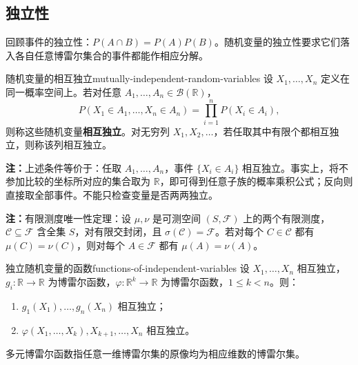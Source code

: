 \subsection*{独立性}

回顾事件的独立性：$P(A\cap B)=P(A)P(B)$。随机变量的独立性要求它们落入各自任意博雷尔集合的事件都能作相应分解。

\begin{mydefinition}{随机变量的相互独立}{mutually-independent-random-variables}
设 $X_1,\ldots,X_n$ 定义在同一概率空间上。若对任意 $A_1,\ldots,A_n\in\mathcal B(\mathbb R)$，
\[
P(X_1\in A_1,\ldots,X_n\in A_n)=\prod_{i=1}^nP(X_i\in A_i),
\]
则称这些随机变量\textbf{相互独立}。对无穷列 $X_1,X_2,\ldots$，若任取其中有限个都相互独立，则称该列相互独立。
\end{mydefinition}

\textbf{注：}\quad 上述条件等价于：任取 $A_1,\ldots,A_n$，事件 $\{X_i\in A_i\}$ 相互独立。事实上，将不参加比较的坐标所对应的集合取为 $\mathbb R$，即可得到任意子族的概率乘积公式；反向则直接取全部事件。不能只检查变量是否两两独立。

\textbf{注：}\quad 有限测度唯一性定理：设 $\mu,\nu$ 是可测空间 $(S,\mathcal F)$ 上的两个有限测度，$\mathcal C\subseteq\mathcal F$ 含全集 $S$，对有限交封闭，且 $\sigma(\mathcal C)=\mathcal F$。若对每个 $C\in\mathcal C$ 都有 $\mu(C)=\nu(C)$，则对每个 $A\in\mathcal F$ 都有 $\mu(A)=\nu(A)$。

\begin{proposition}{独立随机变量的函数}{functions-of-independent-variables}
设 $X_1,\ldots,X_n$ 相互独立，$g_i:\mathbb R\to\mathbb R$ 为博雷尔函数，$\varphi:\mathbb R^k\to\mathbb R$ 为博雷尔函数，$1\leq k<n$。则：
\begin{enumerate}
\item $g_1(X_1),\ldots,g_n(X_n)$ 相互独立；
\item $\varphi(X_1,\ldots,X_k),X_{k+1},\ldots,X_n$ 相互独立。
\end{enumerate}
多元博雷尔函数指任意一维博雷尔集的原像均为相应维数的博雷尔集。
\end{proposition}

